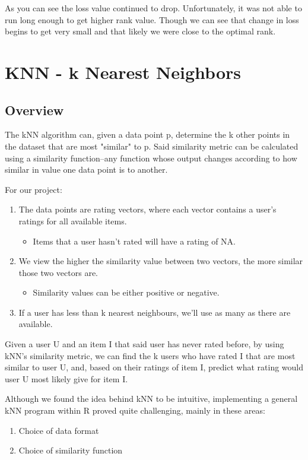 \documentclass{article}
\begin{document}
As you can see the loss value continued to drop. Unfortunately, it was not able to run long enough to get higher rank value. Though we can see that change in loss begins to get very small and that likely we were close to the optimal rank.

\section{KNN - k Nearest Neighbors}

\subsection{Overview}

The kNN algorithm can, given a data point p, determine the k other points in the dataset that are most "similar" to p. Said similarity metric can be calculated using a similarity function--any function whose output changes according to how similar in value one data point is to another.

For our project:

\begin{enumerate}
    \item The data points are rating vectors, where each vector contains a user's ratings for all available items.
    \begin{itemize}
        \item Items that a user hasn't rated will have a rating of NA.
    \end{itemize}
    \item We view the higher the similarity value between two vectors, the more similar those two vectors are.
    \begin{itemize}
        \item Similarity values can be either positive or negative.
    \end{itemize}
    \item If a user has less than k nearest neighbours, we'll use as many as there are available.
\end{enumerate}

Given a user U and an item I that said user has never rated before, by using kNN's similarity metric, we can find the k users who have rated I that are most similar to user U, and, based on their ratings of item I, predict what rating would user U most likely give for item I.

Although we found the idea behind kNN to be intuitive, implementing a general kNN program within R proved quite challenging, mainly in these areas:
\begin{enumerate}
    \item Choice of data format
    \item Choice of similarity function
\end{enumerate}
\end{document}
